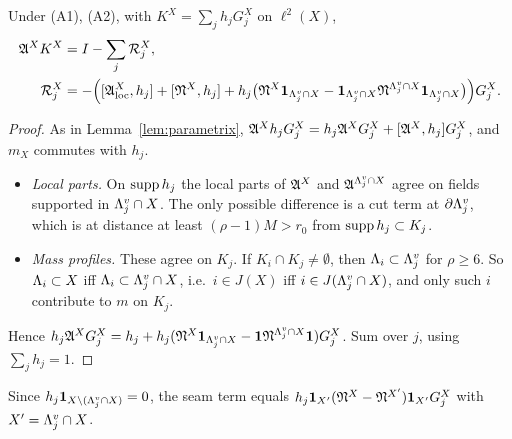 \begin{lemma}\label{lem:parametrix-X}
Under (A1), (A2), with $K^X=\sum_jh_jG^X_j$ on $\ell^2(X)$,
\[
\begin{aligned}
\mathfrak A^XK^X&=I-\sum_j\mathcal R^X_j,\\
\mathcal R^X_j&=-\Big([\mathfrak A^X_{\rm loc},h_j]+[\mathfrak N^X,h_j]+h_j\big(\mathfrak N^X\mathbf 1_{\Lambda^v_j\cap X}-\mathbf 1_{\Lambda^v_j\cap X}\mathfrak N^{\Lambda^v_j\cap X}\mathbf 1_{\Lambda^v_j\cap X}\big)\Big)G^X_j .
\end{aligned}
\]
\end{lemma}

\begin{proof}
As in Lemma~\ref{lem:parametrix}, $\mathfrak A^Xh_jG^X_j=h_j\mathfrak A^XG^X_j+[\mathfrak A^X,h_j]G^X_j$, and $m_X$ commutes with $h_j$.
\begin{itemize}
\item \emph{Local parts.} On $\operatorname{supp} h_j$ the local parts of $\mathfrak A^X$ and $\mathfrak A^{\Lambda^v_j\cap X}$ agree on fields supported in $\Lambda^v_j\cap X$. The only possible difference is a cut term at $\partial\Lambda^v_j$, which is at distance at least $(\rho-1)M>r_0$ from $\operatorname{supp} h_j\subset K_j$.
\item \emph{Mass profiles.} These agree on $K_j$. If $K_i\cap K_j\ne\emptyset$, then $\Lambda_i\subset\Lambda^v_j$ for $\rho\ge6$. So $\Lambda_i\subset X$ iff $\Lambda_i\subset\Lambda^v_j\cap X$, i.e.\ $i\in J(X)$ iff $i\in J(\Lambda^v_j\cap X)$, and only such $i$ contribute to $m$ on $K_j$.
\end{itemize}
Hence $h_j\mathfrak A^XG^X_j=h_j+h_j(\mathfrak N^X\mathbf 1_{\Lambda^v_j\cap X}-\mathbf 1\mathfrak N^{\Lambda^v_j\cap X}\mathbf 1)G^X_j$. Sum over $j$, using $\sum_jh_j=1$.
\end{proof}

Since $h_j\mathbf 1_{X\setminus(\Lambda^v_j\cap X)}=0$, the seam term equals $h_j\mathbf 1_{X'}(\mathfrak N^X-\mathfrak N^{X'})\mathbf 1_{X'}G^X_j$ with $X'=\Lambda^v_j\cap X$.

